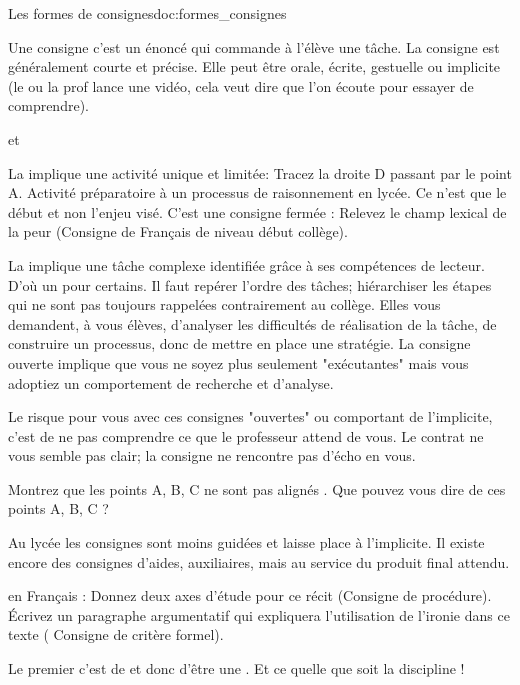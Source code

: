 \begin{doc}{Les formes de consignes}{doc:formes_consignes}
  \begin{listePoints}
    \item Une consigne c'est un énoncé  qui commande à l'élève une tâche. 
    La consigne est généralement courte et précise.
    Elle peut être orale, écrite, gestuelle ou implicite (le ou la prof lance une vidéo, cela veut dire que l'on écoute pour essayer de comprendre).
    \item {} et 
    \begin{listeTirets}
      \item  La  implique une activité unique et limitée: \exemple Tracez la droite D passant par le point A.
      Activité préparatoire à un processus de raisonnement en lycée.
      Ce n'est que le début et non l'enjeu visé.
      C'est une consigne fermée :
      \exemple Relevez le champ lexical de la peur (Consigne de Français de niveau début collège).
      \item La  implique une tâche complexe identifiée grâce à ses compétences de lecteur.
      D'où un  pour certains.
      Il faut repérer l'ordre des tâches; hiérarchiser les étapes qui ne sont pas toujours rappelées contrairement au collège.
      Elles vous demandent, à vous élèves, d'analyser les difficultés de réalisation de la tâche, de construire un processus, donc de mettre en place une stratégie.
      La consigne ouverte implique que vous ne soyez plus seulement "exécutantes" mais vous adoptiez un comportement de recherche et d'analyse.
    \end{listeTirets}
  \end{listePoints}
  
  Le risque pour vous avec ces consignes "ouvertes" ou comportant de l'implicite, c'est de ne pas comprendre ce que le professeur attend de vous.
  Le contrat ne vous semble pas clair; la consigne ne rencontre pas d'écho en vous.
  
  \exemple \og Montrez que les points A, B, C ne sont pas alignés \fg. \og Que pouvez vous dire de ces points A, B, C ? \fg

  Au lycée les consignes sont moins guidées et laisse place à l'implicite.
  Il existe encore des consignes d'aides, auxiliaires, mais au service du produit final attendu.
  
  \exemple en Français : Donnez deux axes d'étude pour ce récit (Consigne de procédure).
  Écrivez un paragraphe argumentatif qui expliquera l'utilisation de l'ironie dans ce texte ( Consigne de critère formel).

  \begin{encart}  
    Le premier 
    c'est de 
    et donc d'être une .
    Et ce quelle que soit la discipline !
  \end{encart}
\end{doc}

